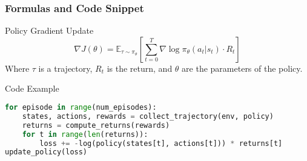 \documentclass[aspectratio=169]{beamer}
\begin{document}
\begin{frame}[fragile]
    \frametitle{Formulas and Code Snippet}
    \begin{block}{Policy Gradient Update}
        \begin{equation}
            \nabla J(\theta) = \mathbb{E}_{\tau \sim \pi_{\theta}} \left[ \sum_{t=0}^{T} \nabla \log \pi_{\theta}(a_t | s_t) \cdot R_t \right]
        \end{equation}
        Where \( \tau \) is a trajectory, \( R_t \) is the return, and \( \theta \) are the parameters of the policy.
    \end{block}
    
    \begin{block}{Code Example}
        \begin{lstlisting}[language=Python]
for episode in range(num_episodes):
    states, actions, rewards = collect_trajectory(env, policy)
    returns = compute_returns(rewards)
    for t in range(len(returns)):
        loss += -log(policy(states[t], actions[t])) * returns[t]
update_policy(loss)
        \end{lstlisting}
    \end{block}
\end{frame}
\end{document}
